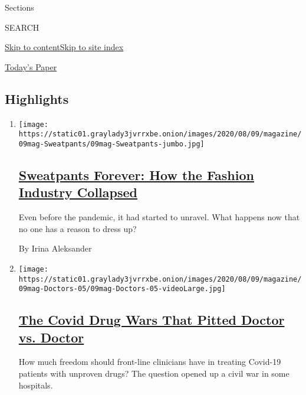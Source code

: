 Sections

SEARCH

\protect\hyperlink{site-content}{Skip to
content}\protect\hyperlink{site-index}{Skip to site index}

\href{https://myaccount.nytimes3xbfgragh.onion/auth/login?response_type=cookie\&client_id=vi}{}

\href{https://www.nytimes3xbfgragh.onion/section/todayspaper}{Today's
Paper}

\hypertarget{highlights}{%
\subsection{Highlights}\label{highlights}}

\begin{enumerate}
\def\labelenumi{\arabic{enumi}.}
\item
  \texttt{[image: https://static01.graylady3jvrrxbe.onion/images/2020/08/09/magazine/09mag-Sweatpants/09mag-Sweatpants-jumbo.jpg]}

  \hypertarget{sweatpants-forever-how-the-fashion-industry-collapsed}{%
  \subsection{\texorpdfstring{\href{/interactive/2020/08/06/magazine/fashion-sweatpants.html}{Sweatpants
  Forever: How the Fashion Industry
  Collapsed}}{Sweatpants Forever: How the Fashion Industry Collapsed}}\label{sweatpants-forever-how-the-fashion-industry-collapsed}}

  Even before the pandemic, it had started to unravel. What happens now
  that no one has a reason to dress up?

  By Irina Aleksander
\item
  \texttt{[image: https://static01.graylady3jvrrxbe.onion/images/2020/08/09/magazine/09mag-Doctors-05/09mag-Doctors-05-videoLarge.jpg]}

  \hypertarget{the-covid-drug-wars-that-pitted-doctor-vs-doctor}{%
  \subsection{\texorpdfstring{\href{/2020/08/05/magazine/covid-drug-wars-doctors.html}{The
  Covid Drug Wars That Pitted Doctor vs.
  Doctor}}{The Covid Drug Wars That Pitted Doctor vs. Doctor}}\label{the-covid-drug-wars-that-pitted-doctor-vs-doctor}}

  How much freedom should front-line clinicians have in treating
  Covid-19 patients with unproven drugs? The question opened up a civil
  war in some hospitals.


\end{enumerate}
